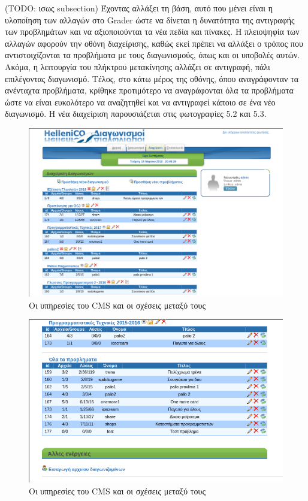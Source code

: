 \documentclass[diploma]{softlab-thesis}
\begin{document}
\bigskip

(TODO: ισως subsection) Έχοντας αλλάξει τη βάση, αυτό που μένει είναι η
υλοποίηση των αλλαγών στο Grader ώστε να δίνεται η δυνατότητα της αντιγραφής
των προβλημάτων και να αξιοποιούνται τα νέα πεδία και πίνακες. Η πλειοψηφία των
αλλαγών αφορούν την οθόνη διαχείρισης, καθώς εκεί πρέπει να αλλάξει ο τρόπος
που αντιστοιχίζονται τα προβλήματα με τους διαγωνισμούς, όπως και οι υποβολές
αυτών. Ακόμα, η λειτουργία του πλήκτρου μετακίνησης αλλάζει σε αντιγραφή, πάλι
επιλέγοντας διαγωνισμό. Τέλος, στο κάτω μέρος της οθόνης, όπου αναγράφονταν τα
ανένταχτα προβλήματα, κρίθηκε προτιμότερο να αναγράφονται όλα τα προβλήματα
ώστε να είναι ευκολότερο να αναζητηθεί και να αντιγραφεί κάποιο σε ένα νέο
διαγωνισμό. Η νέα διαχείριση παρουσιάζεται στις φωτογραφίες 5.2 και 5.3.

\bigskip

\begin{figure}
  \centering
  \includegraphics[scale=0.4,trim=4 4 4 4,clip]{Figures/aftersep.png}
  \caption[Η αρχιτεκτονική του CMS]{Οι υπηρεσίες του CMS και οι σχέσεις μεταξύ τους}
\end{figure}

\begin{figure}
  \centering
  \includegraphics[scale=0.4,trim=4 4 4 4,clip]{Figures/aftersepall.png}
  \caption[Η αρχιτεκτονική του CMS]{Οι υπηρεσίες του CMS και οι σχέσεις μεταξύ τους}
\end{figure}
\end{document}
